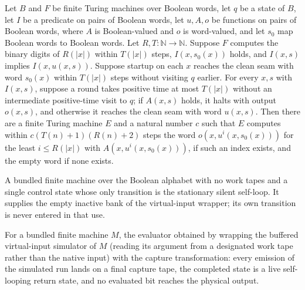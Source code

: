 \begin{theorem}
\label{Turing.FinTM.exists_loopFindTM}
\leanok
{}
Let $B$ and $F$ be finite Turing machines over Boolean words, let $q$ be a state of $B$,
let $I$ be a predicate on pairs of Boolean words, let $u,A,o$ be functions on pairs of
Boolean words, where $A$ is Boolean-valued and $o$ is word-valued, and let $s_0$ map
Boolean words to Boolean words. Let $R,T : \mathbb{N} \to \mathbb{N}$. Suppose $F$
computes the binary digits of $R(|x|)$ within $T(|x|)$ steps, $I(x,s_0(x))$ holds, and
$I(x,s)$ implies $I(x,u(x,s))$. Suppose startup on each $x$ reaches the clean seam with
word $s_0(x)$ within $T(|x|)$ steps without visiting $q$ earlier. For every $x,s$ with
$I(x,s)$, suppose a round takes positive time at most $T(|x|)$ without an intermediate
positive-time visit to $q$; if $A(x,s)$ holds, it halts with output $o(x,s)$, and
otherwise it reaches the clean seam with word $u(x,s)$. Then there are a finite Turing
machine $E$ and a natural number $c$ such that $E$ computes within $c(T(n)+1)(R(n)+2)$
steps the word $o(x,u^i(x,s_0(x)))$ for the least $i\le R(|x|)$ with
$A(x,u^i(x,s_0(x)))$, if such an index exists, and the empty word if none exists.
\end{theorem}

\begin{definition}
\label{Turing.FinTM.emCallIdleTM}
\leanok
{}
A bundled finite machine over the Boolean alphabet with no work tapes and a single
control state whose only transition is the stationary silent self-loop. It supplies the
empty inactive bank of the virtual-input wrapper; its own transition is never entered in
that use.
\end{definition}

\begin{definition}
\label{Turing.FinTM.emCallEvalTM}
\leanok
{}
For a bundled finite machine $M$, the evaluator obtained by wrapping the buffered
virtual-input simulator of $M$ (reading its argument from a designated work tape rather
than the native input) with the capture transformation: every emission of the simulated
run lands on a final capture tape, the completed state is a live self-looping return
state, and no evaluated bit reaches the physical output.
\end{definition}

